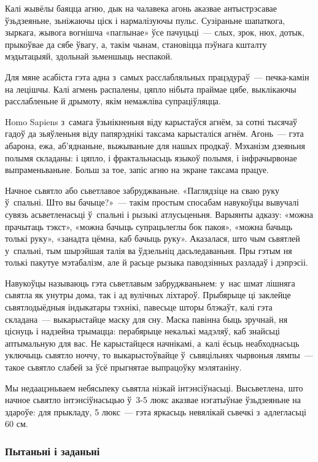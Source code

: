 Калі жывёлы баяцца агню, дык на чалавека агонь аказвае антыстрэсавае ўзьдзеяньне, зьніжаючы ціск і нармалізуючы пульс. Сузіраньне шапаткога, зыркага, жывога вогнішча «паглынае» ўсе пачуцьці~--- слых, зрок, нюх, дотык, прыкоўвае да сябе ўвагу, а, такім чынам, становіцца пэўнага кшталту мэдытацыяй, здольнай зьменшыць неспакой.

Для мяне асабіста гэта адна з~самых расслабляльных працэдураў~--- печка-камін на лецішчы. Калі агмень распалены, цяпло нібыта праймае цябе, выклікаючы расслабленьне й дрымоту, якім немажліва супраціўляцца.

Homo Sapiens з~самага ўзьнікненьня віду карыстаўся агнём, за сотні тысячаў гадоў да зьяўленьня віду папярэднікі таксама карысталіся агнём. Агонь~--- гэта абарона, ежа, аб'яднаньне, выжываньне для нашых продкаў. Мэханізм дзеяньня полымя складаны: і цяпло, і фрактальнасьць языкоў полымя, і інфрачырвонае выпраменьваньне. Больш за тое, запіс агню на экране таксама працуе.

Начное сьвятло або сьветлавое забруджваньне. «Паглядзіце на сваю руку ў~спальні. Што вы бачыце?»~--- такім простым спосабам навукоўцы вывучалі сувязь асьветленасьці ў~спальні і рызыкі атлусьценьня. Варыянты адказу: «можна прачытаць тэкст», «можна бачыць супрацьлеглы бок пакоя», «можна бачыць толькі руку», «занадта цёмна, каб бачыць руку». Аказалася, што чым сьвятлей у~спальні, тым шырэйшая талія ва ўдзельніц дасьледаваньня. Пры гэтым ня толькі пакутуе мэтабалізм, але й расьце рызыка паводзінных разладаў і дэпрэсіі.

Навукоўцы называюць гэта сьветлавым забруджваньнем: у~нас шмат лішняга сьвятла як унутры дома, так і ад вулічных ліхтароў. Прыбярыце ці заклейце сьвятлодыёдныя індыкатары тэхнікі, павесьце шторы блэкаўт, калі гэта складана~--- выкарыстайце маску для сну. Маска павінна быць зручнай, ня ціснуць і надзейна трымацца: перабярыце некалькі мадэляў, каб знайсьці аптымальную для вас. Не карыстайцеся начнікамі, а~калі ёсьць неабходнасьць уключыць сьвятло ноччу, то выкарыстоўвайце ў~сьвяцільнях чырвоныя лямпы~--- такое сьвятло слабей за ўсё прыгнятае выпрацоўку мэлятаніну.

Мы недаацэньваем небясьпеку сьвятла нізкай інтэнсіўнасьці. Высьветлена, што начное сьвятло інтэнсіўнасьцью ў~3-5 люкс аказвае нэгатыўнае ўзьдзеяньне на здароўе: для прыкладу, 5 люкс~--- гэта яркасьць невялікай сьвечкі з~адлегласьці 60 см.

\subsubsection{Пытаньні і заданьні}

